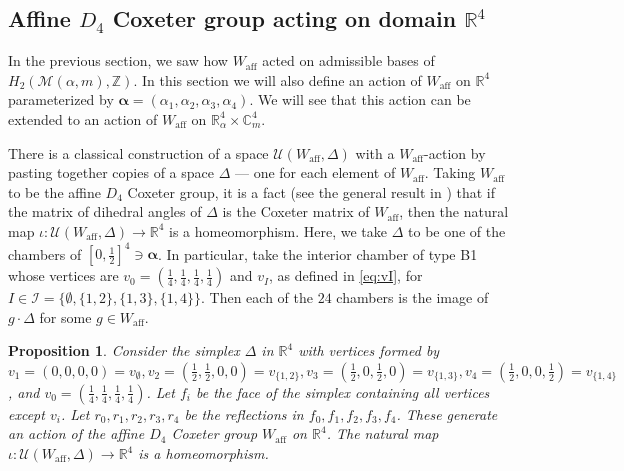\documentclass[12pt,letterpaper,reqno]{amsart}
\def\bm#1{#1}%
\def\mathbf#1{#1}%
\newtheorem{prop}[thm]{Proposition}
\theoremstyle{remark}
\theoremstyle{definition}
\numberwithin{thm}{section}
\numberwithin{equation}{section}
\numberwithin{figure}{section}
\newcommand{\cM}{\ensuremath{\mathcal M}}
\newcommand{\R}{\ensuremath{\mathbb R}}
\newcommand{\C}{\ensuremath{\mathbb C}}
\newcommand{\Z}{\ensuremath{\mathbb Z}}
\newcommand{\bfalpha}{\ensuremath{\bm \alpha}}
\newcommand{\aff}{\mathrm{aff}}
\newcommand{\bfm}{\mathbf{m}}
\newcommand{\Simplex}{\Delta}
\begin{document}
    
  
\subsection{Affine \texorpdfstring{$D_4$}{D4} Coxeter group acting on domain \texorpdfstring{$\R^4$}{R4}}\label{sec:R4action}


In the previous section, we saw how $W_{\mathrm{aff}}$ acted on admissible bases of $H_2(\cM(\bfalpha,\bfm),\Z)$. In this section we will also define an action of $W_{\mathrm{aff}}$ on $\R^4$ parameterized by $\boldsymbol{\alpha}=(\alpha_1,\alpha_2,\alpha_3,\alpha_4)$. We will see that this action can be extended to an action of $W_\aff$ on $\R^4_{\bfalpha} \times \C^4_\bfm$.
  

      
    There is a classical construction of a space $\mathcal{U}(W_{\mathrm{aff}}, \Simplex)$ with a $W_{\mathrm{aff}}$-action by pasting together copies of a space $\Simplex$ --- one for each element of $W_{\mathrm{aff}}$. Taking $W_{\mathrm{aff}}$ to be the affine $D_4$ Coxeter group, it is a fact (see the general result in \cite[Theorem 6.4.3]{Davis}) that if the matrix of dihedral angles of $\Simplex$ is the Coxeter matrix of $W_{\mathrm{aff}}$, then the natural map $\iota: \mathcal{U}(W_{\mathrm{aff}}, \Simplex) \to \R^4$ is a homeomorphism. Here, we take $\Simplex$  to be  one of the chambers of $[0, \frac{1}{2}]^4 \ni \boldsymbol{\alpha}$. In particular, take the interior chamber of type B1 whose vertices are $v_0 =(\frac{1}{4}, \frac{1}{4}, \frac{1}{4}, \frac{1}{4})$ and $v_I$, as defined in \eqref{eq:vI}, for $I \in \mathcal{I}=\{\emptyset, \{1, 2\}, \{1, 3\}, \{1, 4\}\}$. Then each of the $24$ chambers is the image of $g \cdot \Simplex$ for some $g \in W_{\mathrm{aff}}$. 
   
  \begin{prop}\label{prop:homeo}%
  Consider the simplex $\Simplex$ in $\R^4$ with vertices formed by $v_1=(0, 0, 0, 0)=v_{\emptyset}, v_2=(\frac{1}{2}, \frac{1}{2}, 0, 0)=v_{\{1, 2\}}, v_3=(\frac{1}{2}, 0, \frac{1}{2}, 0)=v_{\{1, 3\}}, v_4=(\frac{1}{2}, 0, 0, \frac{1}{2})=v_{\{1, 4\}}$, and $v_0=(\frac{1}{4}, \frac{1}{4}, \frac{1}{4}, \frac{1}{4})$. 
  Let $f_i$ be the face of the simplex containing all vertices except $v_i$. Let $r_0, r_1, r_2, r_3, r_4$ be the reflections in $f_0, f_1, f_2, f_3, f_4$. These generate an action of the affine $D_4$ Coxeter group $W_{\mathrm{aff}}$ on $\R^4$. The natural map
$\iota: \mathcal{U}(W_{\mathrm{aff}}, \Simplex) \to \R^4$ is a homeomorphism. 
  \end{prop}
 
\end{document}
